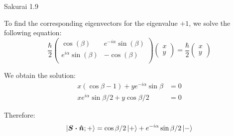 \documentclass{article}
\begin{document}
\begin{section}{Sakurai 1.9}
\begin{tcolorbox}[breakable]
		To find the corresponding eigenvectors for the eigenvalue $+1$, we solve the following equation:
		\begin{equation*}
			\frac{\hbar}{2}
			\left(
			\begin{array}{cc}
					\cos (\beta )              & e^{-i \alpha} \sin (\beta ) \\
					e^{i \alpha} \sin (\beta ) & -\cos (\beta )              \\
				\end{array}
			\right)
			\begin{pmatrix}
				x \\
				y
			\end{pmatrix}
			= \frac{\hbar}{2}
			\begin{pmatrix}
				x \\
				y
			\end{pmatrix}
		\end{equation*}

		We obtain the solution:
		\begin{align*}
			x (\cos{\beta} -1) + y e^{-i \alpha} \sin{\beta}    & = 0 \\
			x e^{i \alpha} \sin{\beta / 2}  + y \cos{\beta / 2} & = 0
		\end{align*}

		Therefore:
		\begin{equation*}
			\ket{\boldsymbol{S \cdot \hat{n}}; +} = \cos{\beta / 2} \ket{+} + e^{-i \alpha} \sin{\beta / 2} \ket{-}
		\end{equation*}
	\end{tcolorbox}
\end{section}
\end{document}
